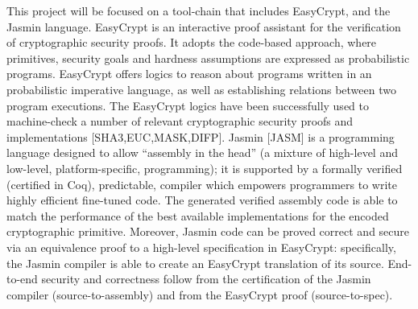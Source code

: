 \documentclass[preprint]{iacrtrans}
\begin{document}
This project will be focused on a tool-chain that includes EasyCrypt,
and the Jasmin language. EasyCrypt is an interactive proof assistant
for the verification of cryptographic security proofs. It adopts the
code-based approach, where primitives, security goals and hardness
assumptions are expressed as probabilistic programs. EasyCrypt offers
logics to reason about programs written in an probabilistic imperative
language, as well as establishing relations between two program
executions. The EasyCrypt logics have been successfully used to
machine-check a number of relevant cryptographic security proofs and
implementations [SHA3,EUC,MASK,DIFP]. Jasmin [JASM] is a programming
language designed to allow “assembly in the head” (a mixture of
high-level and low-level, platform-specific, programming); it is
supported by a formally verified (certified in Coq), predictable,
compiler which empowers programmers to write highly efficient
fine-tuned code. The generated verified assembly code is able to match
the performance of the best available implementations for the encoded
cryptographic primitive. Moreover, Jasmin code can be proved correct
and secure via an equivalence proof to a high-level specification in
EasyCrypt: specifically, the Jasmin compiler is able to create an
EasyCrypt translation of its source. End-to-end security and
correctness follow from the certification of the Jasmin compiler
(source-to-assembly) and from the EasyCrypt proof (source-to-spec).
\end{document}
